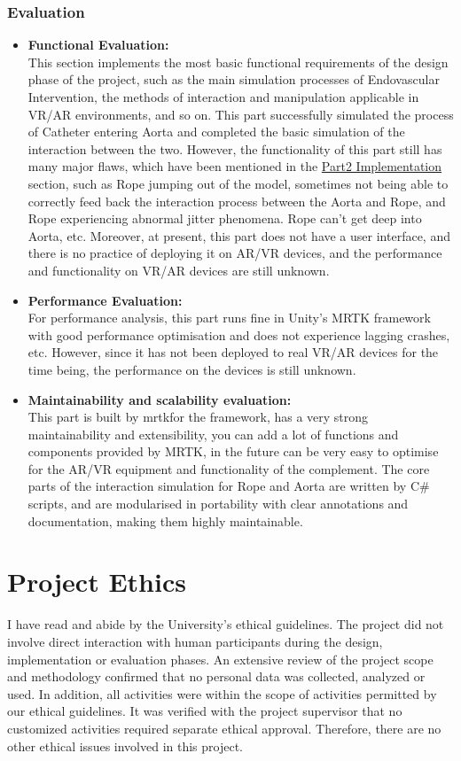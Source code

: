 \documentclass[12pt]{article}
\begin{document}
\subsubsection{Evaluation}
\begin{itemize}
      \item \textbf{Functional Evaluation:}
      \\
      This section implements the most basic functional requirements of the design phase of the project, such as the main simulation processes of Endovascular Intervention, the methods of interaction and manipulation applicable in VR/AR environments, and so on. This part successfully simulated the process of Catheter entering Aorta and completed the basic simulation of the interaction between the two. However, the functionality of this part still has many major flaws, which have been mentioned in the \hyperref[sec:implementation]{Part2 Implementation} section, such as Rope jumping out of the model, sometimes not being able to correctly feed back the interaction process between the Aorta and Rope, and Rope experiencing abnormal jitter phenomena. Rope can't get deep into Aorta, etc. Moreover, at present, this part does not have a user interface, and there is no practice of deploying it on AR/VR devices, and the performance and functionality on VR/AR devices are still unknown.
      \item \textbf{Performance Evaluation:}
      \\
      For performance analysis, this part runs fine in Unity's MRTK framework with good performance optimisation and does not experience lagging crashes, etc. However, since it has not been deployed to real VR/AR devices for the time being, the performance on the devices is still unknown.
     
      \item \textbf{Maintainability and scalability evaluation:}
      \\
      This part is built by \gls{mrtk}for the framework, has a very strong maintainability and extensibility, you can add a lot of functions and components provided by MRTK, in the future can be very easy to optimise for the AR/VR equipment and functionality of the complement. The core parts of the interaction simulation for Rope and Aorta are written by C\# scripts, and are modularised in portability with clear annotations and documentation, making them highly maintainable.
 \end{itemize}
\section{Project Ethics}
I have read and abide by the University’s ethical guidelines\cite{UoL_COMP390_2023-24}. The project did not involve direct interaction with human
participants during the design, implementation or evaluation phases. An extensive review of the project scope and methodology
confirmed that no personal data was collected, analyzed or used. In addition, all activities were within the scope of activities
permitted by our ethical guidelines. It was verified with the project supervisor that no customized activities required separate
ethical approval. Therefore, there are no other ethical issues involved in this project.
\end{document}
